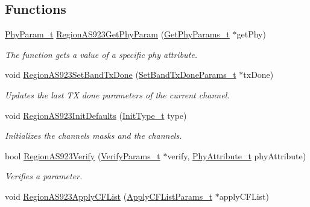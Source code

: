 \subsection*{Functions}
\begin{DoxyCompactItemize}
\item 
\hyperlink{group__REGION_gaed159b26e5c4677236b6e8677019db30}{Phy\+Param\+\_\+t} \hyperlink{group__REGIONAS923_ga20508dee35c0f25ff507478c5235fdeb}{Region\+A\+S923\+Get\+Phy\+Param} (\hyperlink{group__REGION_gab471483fff904f4f89bbc03f7fc380ab}{Get\+Phy\+Params\+\_\+t} $\ast$get\+Phy)
\begin{DoxyCompactList}\small\item\em The function gets a value of a specific phy attribute. \end{DoxyCompactList}\item 
void \hyperlink{group__REGIONAS923_ga8e986a04899f4346d7005b5ab3722298}{Region\+A\+S923\+Set\+Band\+Tx\+Done} (\hyperlink{group__REGION_gad0524aa0673c0814a71e7a4f9cade3fc}{Set\+Band\+Tx\+Done\+Params\+\_\+t} $\ast$tx\+Done)
\begin{DoxyCompactList}\small\item\em Updates the last TX done parameters of the current channel. \end{DoxyCompactList}\item 
void \hyperlink{group__REGIONAS923_ga24e0f9bd2b50e0a8efb5e3d5ecc12904}{Region\+A\+S923\+Init\+Defaults} (\hyperlink{group__REGION_gaddc73ae10673ec925724e7870363bda9}{Init\+Type\+\_\+t} type)
\begin{DoxyCompactList}\small\item\em Initializes the channels masks and the channels. \end{DoxyCompactList}\item 
bool \hyperlink{group__REGIONAS923_ga6287722023036c70f4a9b1ec43901be5}{Region\+A\+S923\+Verify} (\hyperlink{group__REGION_ga966d97bc2f25df1c09e92e60ef652276}{Verify\+Params\+\_\+t} $\ast$verify, \hyperlink{group__REGION_ga9445b07fdf77581ecfaf389970e635f8}{Phy\+Attribute\+\_\+t} phy\+Attribute)
\begin{DoxyCompactList}\small\item\em Verifies a parameter. \end{DoxyCompactList}\item 
void \hyperlink{group__REGIONAS923_ga06106e86f717362c50165a5adaf73331}{Region\+A\+S923\+Apply\+C\+F\+List} (\hyperlink{group__REGION_ga71588e9ad07e34b78fa91d51881fd3c6}{Apply\+C\+F\+List\+Params\+\_\+t} $\ast$apply\+C\+F\+List)

\end{DoxyCompactItemize}
